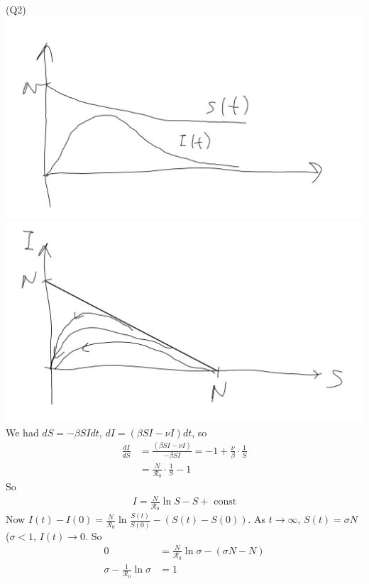 \documentclass[a4paper]{article}
\begin{document}
(Q2)\\
\includegraphics[scale=0.5]{image/Bio_06.png}
\includegraphics[scale=0.5]{image/Bio_07.png}
We had $dS = -\beta SI dt$, $dI = (\beta SI - \nu I) dt$, so
\begin{equation*}
\begin{aligned}
\frac{dI}{dS} &= \frac{(\beta SI - \nu I)}{-\beta SI} = -1 + \frac{\nu}{\beta} \cdot \frac{1}{S}\\
&= \frac{N}{\mathcal{R}_0} \cdot \frac{1}{S} - 1
\end{aligned}
\end{equation*}
So
\begin{equation*}
\begin{aligned}
I=\frac{N}{\mathcal{R}_0} \ln S - S + \text{ const}
\end{aligned}
\end{equation*}
Now $I(t)-I(0) = \frac{N}{\mathcal{R}_0} \ln \frac{S(t)}{S(0)} - (S(t)-S(0))$. As $t \to \infty$, $S(t) = \sigma N$ ($\sigma < 1$, $I(t) \to 0$. So
\begin{equation*}
\begin{aligned}
0 &= \frac{N}{\mathcal{R}_0} \ln \sigma - (\sigma N-N)\\
\sigma - \frac{1}{\mathcal{R}_0} \ln \sigma &= 1
\end{aligned}
\end{equation*}
\end{document}
